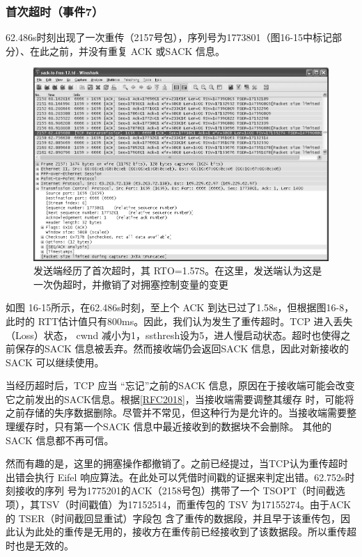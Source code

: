 \subsubsection{首次超时（事件7）}
62.486s时刻出现了一次重传（2157号包），序列号为1773801（图16-15中标记部分）、在此之前，并没有重复 ACK 或SACK 信息。
\begin{figure}[!htb]
    \centering
	\includegraphics[width=1\textwidth]{imgs/16/16-15.png}
	\caption{发送端经历了首次超时，其 RTO=1.57S。在这里，发送端认为这是一次伪超时，并撤销了对拥塞控制变量的变更}
\end{figure}
如图 16-15所示，在62.486s时刻，至上个 ACK 到达已过了1.58s，但根据图16-8，此时的 RTT估计值只有800ms。因此，我们认为发生了重传超时。TCP 进入丢失（Loss）状态，
cwnd 减小为1，ssthresh设为5，进人慢启动状态。超时也使得之前保存的SACK 信息被丢弃。然而接收端仍会返回SACK 信息，因此对新接收的 SACK 可以继续使用。

\begin{tcolorbox}
    当经历超时后，TCP 应当 “忘记”之前的SACK 信息，原因在于接收端可能会改变它之前发出的SACK信息。根据\href{https://www.rfc-editor.org/rfc/rfc2018}{[RFC2018]}，当接收端需要调整其缓存
    时，可能将之前存储的失序数据删除。尽管并不常见，但这种行为是允许的。当接收端需要整理缓存时，只有第一个SACK 信息中最近接收到的数据块不会删除。
    其他的 SACK 信息都不再可信。
\end{tcolorbox}

然而有趣的是，这里的拥塞操作都撤销了。之前已经提过，当TCP认为重传超时出错会执行 Eifel 响应算法。在此处可以凭借时间戳的证据来判定出错。62.752s时刻接收的序列
号为1775201的ACK（2158号包）携带了一个 TSOPT（时间截选项），其TSV（时间戳值）为17152514，而重传包的 TSV 为17155274。由于ACK 的 TSER（时间截回显重试）字段包
含了重传的数据段，并且早于该重传包，因此认为此处的重传是无用的，接收方在重传前已经接收到了该数据段。所以重传超时也是无效的。

